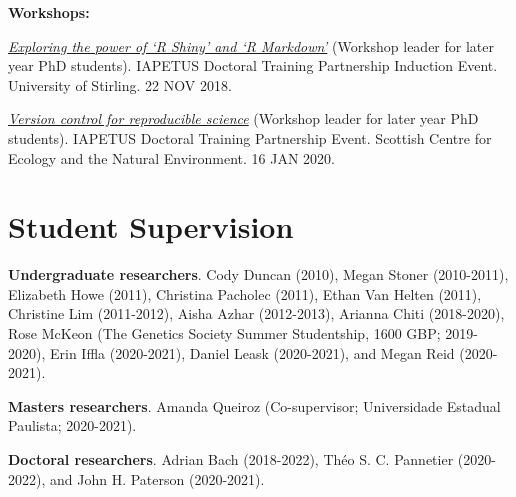 \documentclass[letterpaper]{article}
\renewenvironment{itemize}{
  \begin{list}{}{
    \setlength{\leftmargin}{1.5em}
  }
}{
  \end{list}
}
\begin{document}
\begin{itemize}
\item {\bf Workshops:}
\begin{itemize}
\item[$\bullet$]{{\it \href{https://bradduthie.github.io/blog/Manuscripts-in-Rmarkdown/}{Exploring the power of `R Shiny' and `R Markdown'}} (Workshop leader for later year PhD students). IAPETUS Doctoral Training Partnership Induction Event. University of Stirling. 22 NOV 2018.}
\item[$\bullet$]{{\it \href{https://bradduthie.github.io/version_control/vc_notes.html}{Version control for reproducible science}} (Workshop leader for later year PhD students). IAPETUS Doctoral Training Partnership Event. Scottish Centre for Ecology and the Natural Environment. 16 JAN 2020.}
\end{itemize}

\end{itemize}

\section*{Student Supervision}
\begin{itemize}
\item {\bf Undergraduate researchers}. Cody Duncan (2010), Megan Stoner (2010-2011), Elizabeth Howe (2011), Christina Pacholec (2011), Ethan Van Helten (2011), Christine Lim (2011-2012), Aisha Azhar (2012-2013), Arianna Chiti (2018-2020), Rose McKeon (The Genetics Society Summer Studentship, 1600 GBP; 2019-2020), Erin Iffla (2020-2021), Daniel Leask (2020-2021), and Megan Reid (2020-2021).
\item {\bf Masters researchers}. Amanda Queiroz (Co-supervisor; Universidade Estadual Paulista; 2020-2021).
\item {\bf Doctoral researchers}. Adrian Bach (2018-2022), Th\'{e}o S. C. Pannetier (2020-2022), and John H. Paterson (2020-2021).
\end{itemize}
\end{document}
